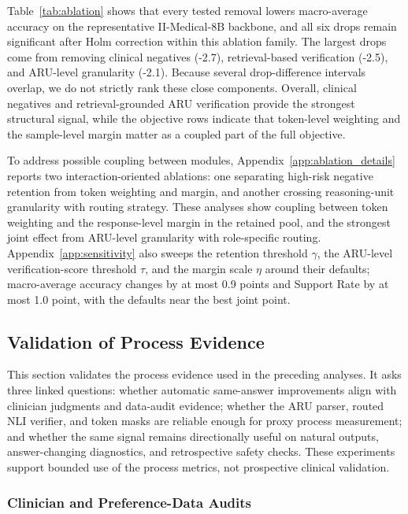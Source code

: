 \documentclass[a4paper,fleqn,doubleblind]{cas-sc}
\begin{document}
Table~\ref{tab:ablation} shows that every tested removal lowers macro-average accuracy on the representative II-Medical-8B backbone, and all six drops remain significant after Holm correction within this ablation family. The largest drops come from removing clinical negatives (-2.7), retrieval-based verification (-2.5), and ARU-level granularity (-2.1). Because several drop-difference intervals overlap, we do not strictly rank these close components. Overall, clinical negatives and retrieval-grounded ARU verification provide the strongest structural signal, while the objective rows indicate that token-level weighting and the sample-level margin matter as a coupled part of the full objective.

To address possible coupling between modules, Appendix~\ref{app:ablation_details} reports two interaction-oriented ablations: one separating high-risk negative retention from token weighting and margin, and another crossing reasoning-unit granularity with routing strategy. These analyses show coupling between token weighting and the response-level margin in the retained pool, and the strongest joint effect from ARU-level granularity with role-specific routing. Appendix~\ref{app:sensitivity} also sweeps the retention threshold $\gamma$, the ARU-level verification-score threshold $\tau$, and the margin scale $\eta$ around their defaults; macro-average accuracy changes by at most 0.9 points and Support Rate by at most 1.0 point, with the defaults near the best joint point.

\FloatBarrier

\subsection{Validation of Process Evidence}
\label{subsec:evidence_validation}

This section validates the process evidence used in the preceding analyses. It asks three linked questions: whether automatic same-answer improvements align with clinician judgments and data-audit evidence; whether the ARU parser, routed NLI verifier, and token masks are reliable enough for proxy process measurement; and whether the same signal remains directionally useful on natural outputs, answer-changing diagnostics, and retrospective safety checks. These experiments support bounded use of the process metrics, not prospective clinical validation.

\subsubsection{Clinician and Preference-Data Audits}
\label{subsec:same_answer_clinician_validation}
\label{subsec:negative_audit}
\label{subsec:preference_label_audit}
\end{document}
